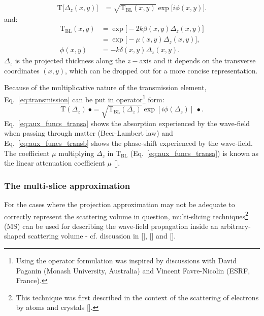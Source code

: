 \begin{refsection}
\begin{align}
\mathrm{T}\big[\Delta_z(x,y)] &=\sqrt{\mathrm{T}_\text{BL}(x,y)}\exp{\big[i\phi(x,y)\big]}.
\end{align}{}
and:
\begin{subequations}
\begin{align}   
    \mathrm{T}_{\text{BL}}(x,y)&=\exp{\big[-2k\beta(x,y)\Delta_z(x,y)\big]}\label{eq:aux_funcs_transa}  \\
    &=\exp{\big[-\mu(x,y)\Delta_z(x,y)\big]},\nonumber\\
    \phi(x,y)&=-k\delta(x,y)\Delta_z(x,y).\label{eq:aux_funcs_transb}
\end{align}
\end{subequations}
$\Delta_z$ is the projected thickness along the $z-$axis and it depends on the transverse coordinates $(x,y)$, which can be dropped out for a more concise representation.

Because of the multiplicative nature of the transmission element, Eq.~\ref{eq:transmission} can be put in operator\footnote{Using the operator formulation was inspired by discussions with David Paganin (Monash University, Australia) and Vincent Favre-Nicolin (ESRF, France).} form:
\begin{equation}\label{eq:transmission_operator}
    \mathrm{T}(\Delta_z)~\bullet =\sqrt{\mathrm{T}_\text{BL}(\Delta_z)}\exp{[i\phi(\Delta_z)]}~\bullet.
\end{equation}
Eq.~\ref{eq:aux_funcs_transa} shows the absorption experienced by the wave-field when passing through matter (Beer-Lambert law) and Eq.~\ref{eq:aux_funcs_transb} shows the phase-shift experienced by the wave-field. The coefficient $\mu$ multiplying $\Delta_z$ in $\mathrm{T}_{\text{BL}}$ (Eq.~\ref{eq:aux_funcs_transa}) is known as the linear attenuation coefficient $\mu$ [\cite[\textit{§1.6}]{Als-Nielsen2011}]. 

\subsubsection*{The multi-slice approximation}

For the cases where the projection approximation may not be adequate to correctly represent the scattering volume in question, multi-slicing techniques\footnote{This technique was first described in the context of the scattering of electrons by atoms and crystals [\cite{Cowley1957}].} (MS) can be used for describing the wave-field propagation inside an arbitrary-shaped scattering volume - cf. discussion in [\cite[\textit{§2.7}]{Paganin2006}], [\cite{Li2017}] and [\cite{Munro2019}].


\end{refsection}
